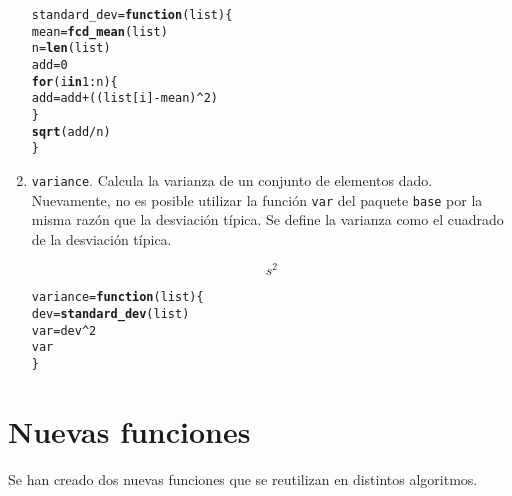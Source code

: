\documentclass[12pt]{report}\usepackage[]{graphicx}\usepackage[dvipsnames]{xcolor}
\makeatletter
\newcommand{\hlnum}[1]{\textcolor[rgb]{0.686,0.059,0.569}{#1}}%
\newcommand{\hlopt}[1]{\textcolor[rgb]{0,0,0}{#1}}%
\newcommand{\hlstd}[1]{\textcolor[rgb]{0.345,0.345,0.345}{#1}}%
\newcommand{\hlkwa}[1]{\textcolor[rgb]{0.161,0.373,0.58}{\textbf{#1}}}%
\newcommand{\hlkwb}[1]{\textcolor[rgb]{0.69,0.353,0.396}{#1}}%
\newcommand{\hlkwc}[1]{\textcolor[rgb]{0.333,0.667,0.333}{#1}}%
\newcommand{\hlkwd}[1]{\textcolor[rgb]{0.737,0.353,0.396}{\textbf{#1}}}%
\newenvironment{kframe}{%
 \def\at@end@of@kframe{}%
 \ifinner\ifhmode%
  \def\at@end@of@kframe{\end{minipage}}%
  \begin{minipage}{\columnwidth}%
 \fi\fi%
 \def\FrameCommand##1{\hskip\@totalleftmargin \hskip-\fboxsep
 \colorbox{shadecolor}{##1}\hskip-\fboxsep
     \hskip-\linewidth \hskip-\@totalleftmargin \hskip\columnwidth}%
 \MakeFramed {\advance\hsize-\width
   \@totalleftmargin\z@ \linewidth\hsize
   \@setminipage}}%
 {\par\unskip\endMakeFramed%
 \at@end@of@kframe}
\newenvironment{knitrout}{}{} %
\makeatother
\begin{document}
\begin{enumerate}[label = \textbf{\arabic*.}]
\begin{knitrout}
\color{fgcolor}\begin{kframe}
\begin{alltt}
\hlstd{standard_dev} \hlkwb{=} \hlkwa{function}\hlstd{(}\hlkwc{list}\hlstd{) \{}
        \hlstd{mean} \hlkwb{=} \hlkwd{fcd_mean}\hlstd{(list)}
        \hlstd{n} \hlkwb{=} \hlkwd{len}\hlstd{(list)}
        \hlstd{add} \hlkwb{=} \hlnum{0}
        \hlkwa{for} \hlstd{(i} \hlkwa{in} \hlnum{1}\hlopt{:}\hlstd{n) \{}
                \hlstd{add} \hlkwb{=} \hlstd{add} \hlopt{+} \hlstd{((list[i]} \hlopt{-} \hlstd{mean)}\hlopt{^}\hlnum{2}\hlstd{)}
        \hlstd{\}}
        \hlkwd{sqrt}\hlstd{(add}\hlopt{/}\hlstd{n)}
\hlstd{\}}
\end{alltt}
\end{kframe}
\end{knitrout}
		 		
		 		\item \texttt{variance}. Calcula la varianza de un conjunto de elementos dado. Nuevamente, no es posible utilizar la función \texttt{var} del paquete \texttt{base} por la misma razón que la desviación típica. Se define la varianza como el cuadrado de la desviación típica.
		 		
		 		$$
		 		s^2
		 		$$
		 		
\begin{knitrout}
\color{fgcolor}\begin{kframe}
\begin{alltt}
\hlstd{variance} \hlkwb{=} \hlkwa{function}\hlstd{(}\hlkwc{list}\hlstd{) \{}
        \hlstd{dev} \hlkwb{=} \hlkwd{standard_dev}\hlstd{(list)}
        \hlstd{var} \hlkwb{=} \hlstd{dev}\hlopt{^}\hlnum{2}
        \hlstd{var}
\hlstd{\}}
\end{alltt}
\end{kframe}
\end{knitrout}
		 		
		 	\end{enumerate}
	 	
	 	\section{Nuevas funciones}
	 	
		 	Se han creado dos nuevas funciones que se reutilizan en distintos algoritmos.
		 	
\end{document}
